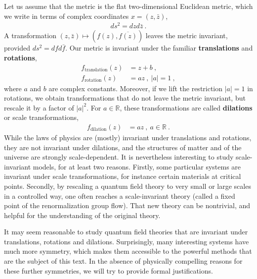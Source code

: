 \documentclass[12pt, a4paper, notitlepage, twoside]{report}
\numberwithin{equation}{section}
\theoremstyle{break}
\begin{document}
Let us assume that the metric is the flat two-dimensional Euclidean metric, which we write in terms of complex coordinates $x=(z,\bar{z})$,
\begin{align}
 ds^2 = dz d\bar{z} \ .
\end{align}
A transformation $(z,\bar{z}) \mapsto (f(z),\overline{f(z)})$ leaves the metric invariant, provided $ds^2 = dfd\bar{f}$.  
Our metric is invariant under the familiar \textbf{\boldmath translations} and \textbf{\boldmath rotations},
\begin{align}
f_\text{translation}(z) &= z+b \ ,
\\ 
f_\text{rotation}(z) &=a z \ , \ |a|=1\ ,
\end{align}
where $a$ and $b$ are complex constants.
Moreover, if we lift the restriction $|a|=1$ in rotations, we obtain transformations that do not leave the metric invariant, but rescale it by a factor of $|a|^2$.
For $a\in{\mathbb{R}}$, these transformations are called \textbf{\boldmath dilations} or scale transformations,
\begin{align}
 f_\text{dilation}(z) &= a z\ , \ a\in {\mathbb{R}}\ .
\end{align}
While the laws of physics are (mostly) invariant under translations and rotations, they are not invariant under dilations, and the structures of matter and of the universe are strongly scale-dependent.
It is nevertheless interesting to study scale-invariant models, for at least two reasons.
Firstly, some particular systems are invariant under scale transformations, for instance certain materials at critical points.
Secondly, by rescaling a quantum field theory to very small or large scales in a controlled way, one often reaches a scale-invariant theory (called a fixed point of the renormalization group flow).
That new theory can be nontrivial, and helpful for the understanding of the original theory.

It may seem reasonable to study quantum field theories that are invariant under translations, rotations and dilations. 
Surprisingly, many interesting systems have much more symmetry, which makes them accessible to the powerful methods that are the subject of this text.
In the absence of physically compelling reasons for these further symmetries, we will try to provide formal justifications.
\end{document}
